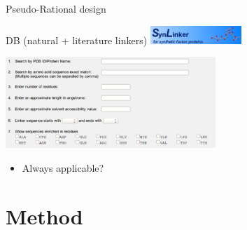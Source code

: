 \documentclass{beamer}
\begin{document}
\begin{frame}{Pseudo-Rational design}

 DB (natural + literature linkers)
 \hspace{10px}
\includegraphics[width=130px]{../img/synLinkerLogo.png} 
\pause

 \vspace{10px}
 \centering
  \includegraphics[width=300px]{../img/synLinker.png} 
\begin{itemize}
 \item Always applicable?
\end{itemize}

\end{frame}









\section{Method}
\end{document}
